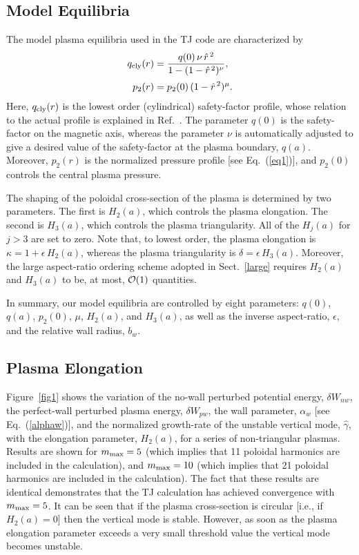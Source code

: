 \documentclass[12pt,prb,aps]{revtex4-1}
\begin{document}
\subsection{Model Equilibria}
The model plasma equilibria used in the TJ code are characterized by
\begin{align}
q_{\rm cly}(r) &= \frac{q(0)\,\nu\,\hat{r}^{\,2}}{1-(1-\hat{r}^{\,2})^\nu},\\[0.5ex]
p_2(r)&=p_2(0)\,(1-\hat{r}^{\,2})^\mu.
\end{align}
Here, $q_{\rm cly}(r)$ is the lowest order (cylindrical) safety-factor profile, whose relation to the actual profile is explained in Ref.~. The parameter $q(0)$ is the
safety-factor on the magnetic axis, whereas the parameter $\nu$ is automatically adjusted to give a desired value of the safety-factor at the plasma boundary, $q(a)$.  
Moreover, $p_2(r)$ is the normalized pressure profile [see Eq.~(\ref{eq1})], and $p_2(0)$ controls the central plasma pressure.
 
 The shaping of the
poloidal cross-section of the plasma is determined by two parameters. The first is  $H_2(a)$, which controls the plasma elongation. The second is $H_3(a)$, which
controls the plasma triangularity. All of the  $H_j(a)$ for $j>3$ are set to zero.
Note that, to lowest order, the plasma elongation is $\kappa=1+\epsilon\,H_2(a)$, whereas the plasma triangularity is $\delta =\epsilon\,H_3(a)$.\cite{eql} Moreover, the large aspect-ratio ordering scheme
adopted in Sect.~\ref{large} requires $H_2(a)$ and $H_3(a)$ to be, at most, ${\cal O}(1)$ quantities. 

In summary, our model equilibria are controlled by eight parameters: $q(0)$, $q(a)$, $p_2(0)$, $\mu$, $H_2(a)$, and $H_3(a)$, as well as the inverse aspect-ratio, $\epsilon$,
and the relative wall radius, $b_w$.  

\subsection{Plasma Elongation}
Figure~\ref{fig1} shows the variation of the no-wall perturbed potential energy, $\delta W_{nw}$, the perfect-wall perturbed plasma energy, $\delta W_{pw}$, the wall 
parameter, $\alpha_w$ [see Eq.~(\ref{alphaw})], and the normalized growth-rate of the unstable vertical mode, $\hat{\gamma}$,  with the elongation parameter, $H_2(a)$, for a series of non-triangular plasmas. Results are shown for $m_{\rm max} = 5$ (which implies that 11 poloidal harmonics are included in the calculation), and $m_{\rm max}=10$ 
(which implies that 21  poloidal harmonics are included in the calculation). The fact that these results are identical demonstrates that the TJ calculation has achieved convergence with
$m_{\rm max}=5$. 
It can be seen that if the
plasma cross-section is circular [i.e., if $H_2(a)=0$] then the vertical mode is stable. However, as soon as the plasma elongation parameter exceeds a very small threshold
value the vertical mode becomes unstable.
\end{document}
